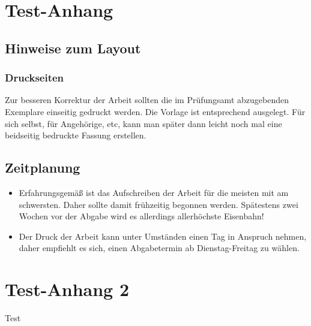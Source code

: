\chapter{Test-Anhang}

\section{Hinweise zum Layout}

\subsection{Druckseiten}

Zur besseren Korrektur der Arbeit sollten die im Prüfungsamt abzugebenden Exemplare einseitig gedruckt werden. Die Vorlage ist entsprechend ausgelegt. Für sich selbst, für Angehörige, etc, kann man später dann leicht noch mal eine beidseitig bedruckte Fassung erstellen.

\section{Zeitplanung}

\begin{itemize}
    \item Erfahrungsgemäß ist das Aufschreiben der Arbeit für die meisten mit am schwersten. Daher sollte damit frühzeitig begonnen werden. Spätestens zwei Wochen vor der Abgabe wird es allerdings allerhöchste Eisenbahn!
    \item Der Druck der Arbeit kann unter Umständen einen Tag in Anspruch nehmen, daher empfiehlt es sich, einen Abgabetermin ab Dienstag-Freitag zu wählen.
\end{itemize}

\cleardoublepage

\chapter{Test-Anhang 2}

Test

\cleardoublepage
